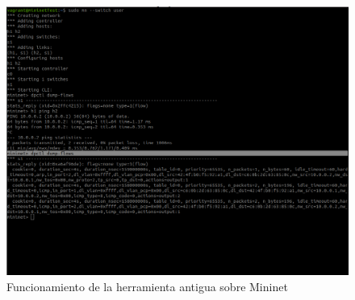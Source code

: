 \begin{figure}[ht]
    \centering
    \includegraphics[width=\textwidth]{archivos/img/dev/dpctl_6.png}
    \caption{Funcionamiento de la herramienta antigua sobre Mininet}
    \label{fig:dpctl_6}
\end{figure}